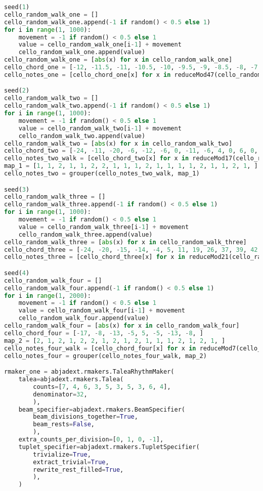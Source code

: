 \begin{lstlisting}[language=Python, caption=Cthar Segment\_I]
seed(1)
cello_random_walk_one = []
cello_random_walk_one.append(-1 if random() < 0.5 else 1)
for i in range(1, 1000):
    movement = -1 if random() < 0.5 else 1
    value = cello_random_walk_one[i-1] + movement
    cello_random_walk_one.append(value)
cello_random_walk_one = [abs(x) for x in cello_random_walk_one]
cello_chord_one = [-12, -11.5, -11, -10.5, -10, -9.5, -9, -8.5, -8, -7.5, -7, -6.5, -6, -5.5, -5, -4.5, -4, -3.5, -3, -2.5, -2, -1.5, -1, -0.5, 0, -0.5, -1, -1.5, -2, -2.5, -3, -3.5, -4, -4.5, -5, -5.5, -6, -6.5, -7, -7.5, -8, -8.5, -9, -9.5, -10, -10.5, -11, -11.5, ]
cello_notes_one = [cello_chord_one[x] for x in reduceMod47(cello_random_walk_one)]

seed(2)
cello_random_walk_two = []
cello_random_walk_two.append(-1 if random() < 0.5 else 1)
for i in range(1, 1000):
    movement = -1 if random() < 0.5 else 1
    value = cello_random_walk_two[i-1] + movement
    cello_random_walk_two.append(value)
cello_random_walk_two = [abs(x) for x in cello_random_walk_two]
cello_chord_two = [-24, -11, -20, -6, -12, -6, 0, -11, -6, 4, 0, 6, 0, -11, -6, -24, -8, 0, ]
cello_notes_two_walk = [cello_chord_two[x] for x in reduceMod17(cello_random_walk_two)]
map_1 = [1, 1, 2, 1, 1, 2, 2, 1, 1, 1, 2, 1, 1, 1, 1, 2, 1, 1, 2, 1, ]
cello_notes_two = grouper(cello_notes_two_walk, map_1)

seed(3)
cello_random_walk_three = []
cello_random_walk_three.append(-1 if random() < 0.5 else 1)
for i in range(1, 1000):
    movement = -1 if random() < 0.5 else 1
    value = cello_random_walk_three[i-1] + movement
    cello_random_walk_three.append(value)
cello_random_walk_three = [abs(x) for x in cello_random_walk_three]
cello_chord_three = [-24, -20, -15, -14, -4, 5, 11, 19, 26, 37, 39, 42, 39, 37, 26, 19, 11, 5, -4, -14, -15, -20, ]
cello_notes_three = [cello_chord_three[x] for x in reduceMod21(cello_random_walk_three)]

seed(4)
cello_random_walk_four = []
cello_random_walk_four.append(-1 if random() < 0.5 else 1)
for i in range(1, 2000):
    movement = -1 if random() < 0.5 else 1
    value = cello_random_walk_four[i-1] + movement
    cello_random_walk_four.append(value)
cello_random_walk_four = [abs(x) for x in cello_random_walk_four]
cello_chord_four = [-17, -8, -13, -5, 5, -5, -13, -8, ]
map_2 = [2, 1, 2, 1, 2, 2, 1, 2, 1, 2, 1, 1, 1, 2, 1, 2, 1, ]
cello_notes_four_walk = [cello_chord_four[x] for x in reduceMod7(cello_random_walk_four)]
cello_notes_four = grouper(cello_notes_four_walk, map_2)

rmaker_one = abjadext.rmakers.TaleaRhythmMaker(
    talea=abjadext.rmakers.Talea(
        counts=[7, 4, 6, 3, 5, 3, 5, 3, 6, 4],
        denominator=32,
        ),
    beam_specifier=abjadext.rmakers.BeamSpecifier(
        beam_divisions_together=True,
        beam_rests=False,
        ),
    extra_counts_per_division=[0, 1, 0, -1],
    tuplet_specifier=abjadext.rmakers.TupletSpecifier(
        trivialize=True,
        extract_trivial=True,
        rewrite_rest_filled=True,
        ),
    )


\end{lstlisting}
